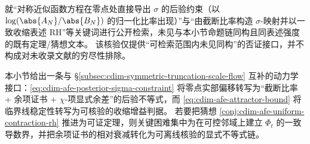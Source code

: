 \begin{remark}[可检索范围内的独立性说明]\label{rem:cdim-afe-posterior-sigma-search-independence}
就“对称近似函数方程在零点处直接导出 \(\sigma\) 的后验约束（以 \(\log(\abs{A_N}/\abs{B_N})\) 的归一化比率出现）”与“由截断比率构造 \(\sigma\)-映射并以一致收缩表述 RH”等关键词进行公开检索，未见与本小节命题链同构且同表述强度的既有定理/猜想文本。
该核验仅提供“可检索范围内未见同构”的否证接口，并不构成对未收录文献的穷尽性排除。
\end{remark}

本小节给出一条与 \S\ref{subsec:cdim-symmetric-truncation-scale-flow} 互补的动力学接口：\eqref{eq:cdim-afe-posterior-sigma-constraint} 将零点实部偏移转写为“截断比率 + 余项证书 + \(\chi\)-项显式余差”的后验不等式，而 \eqref{eq:cdim-afe-attractor-bound} 将临界线稳定性转写为可核验的收缩增益判据。
若要把猜想 \ref{conj:cdim-afe-uniform-contraction-rh} 推进为可证定理，则关键困难集中为在可控邻域上建立 \(\Phi_t\) 的一致导数界，并把余项证书的相对衰减转化为可离线核验的显式不等式链。

\endinput
